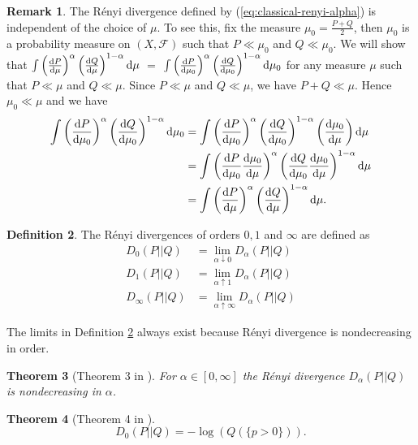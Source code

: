 \documentclass[12pt,a4paper,oneside]{article}
\numberwithin{equation}{section}
\theoremstyle{definition}  %
\newtheorem{defn}{Definition}[section]
\newtheorem{rmk}[defn]{Remark}
\theoremstyle{plain}  %
\newtheorem{thm}[defn]{Theorem}
\theoremstyle{remark} %
\begin{document}
\begin{rmk}
The R\'enyi divergence defined by (\ref{eq:classical-renyi-alpha}) is independent of the choice of $\mu$. To see this, fix the measure $\mu_0=\frac{P+Q}{2}$, then $\mu_0$ is a probability measure on $(X, \mathcal{F})$ such that $P\ll\mu_0$ and  $Q\ll \mu_0.$ 
We will show that $\int \left(\dv{P}{\mu}\right)^{\alpha}\left(\dv{Q}{\mu}\right)^{1-\alpha}\dd \mu$ $=$ $\int \left(\dv{P}{\mu_0}\right)^{\alpha}\left(\dv{Q}{\mu_0}\right)^{1-\alpha}\dd \mu_0$ for any measure $\mu$ such that $P\ll\mu$ and $Q\ll \mu$. Since $P\ll\mu$ and $Q\ll \mu$, we have $P+Q\ll \mu$. Hence $\mu_0\ll\mu$ and we have 
\begin{align*}
\int \left(\dv{P}{\mu_0}\right)^{\alpha}\left(\dv{Q}{\mu_0}\right)^{1-\alpha}\dd \mu_0 & =   \int \left(\dv{P}{\mu_0}\right)^{\alpha}\left(\dv{Q}{\mu_0}\right)^{1-\alpha}\left(\dv{\mu_0}{\mu}\right)\dd \mu\\
&=\int \left(\dv{P}{\mu_0}\dv{\mu_0}{\mu}\right)^{\alpha}\left(\dv{Q}{\mu_0}\dv{\mu_0}{\mu}\right)^{1-\alpha}\dd \mu\\
&=\int \left(\dv{P}{\mu}\right)^{\alpha}\left(\dv{Q}{\mu}\right)^{1-\alpha}\dd \mu.
\end{align*}
\end{rmk}
\begin{defn}\label{defn:extended-orders}
 The R\'enyi divergences of orders $0, 1$ and $\infty$ are defined as \begin{align*}
     D_0(P||Q) &= \lim\limits_{\alpha \downarrow 0} D_{\alpha}(P||Q)\\
     D_1(P||Q) &= \lim\limits_{\alpha \uparrow 1} D_{\alpha}(P||Q)\\
     D_{\infty}(P||Q) &= \lim\limits_{\alpha \uparrow \infty} D_{\alpha}(P||Q)
 \end{align*}
\end{defn}
The limits in Definition \ref{defn:extended-orders} always exist because R\'enyi divergence is nondecreasing in order. 
\begin{thm}[Theorem 3 in \cite{Erven-Harremos-2014}] \label{thm:3-veh}
For $\alpha\in [0, \infty]$ the R\'enyi divergence $D_{\alpha}(P||Q)$ is nondecreasing in $\alpha$.
\end{thm}
\begin{thm}
[Theorem 4 in \cite{Erven-Harremos-2014}] \label{thm:4-veh}
\begin{equation}\label{eq:limit-at-0}D_0 (P||Q) = -\log (Q ({\{p>0\}})).
\end{equation}
\end{thm}   
\end{document}
